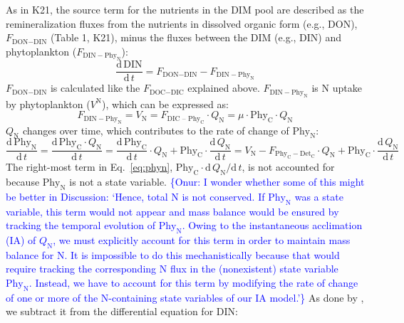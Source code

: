 \documentclass[gmd, manuscript]{copernicus}
\newcommand{\onur}[1]{\textcolor{blue}{\{Onur: #1\}}}
\begin{document}
As in K21, the source term for the nutrients in the DIM pool are described as the remineralization fluxes from the nutrients in dissolved organic form (e.g., DON), $F_{\text{DON}-\text{DIN}}$ (Table 1, K21), minus the fluxes between the DIM (e.g., DIN) and phytoplankton ($F_{\text{DIN}-\text{Phy}_{\text{N}}}$):
\begin{equation} \label{eq:sdin}
  \frac{\text{d}\,\text{DIN}}{\text{d}\,t} = F_{\text{DON}-\text{DIN}} - F_{\text{DIN}-\text{Phy}_{\text{N}}}
\end{equation}
$F_{\text{DON}-\text{DIN}}$ is calculated like the $F_{\text{DOC}-\text{DIC}}$ explained above. $F_{\text{DIN}-\text{Phy}_{\text{N}}}$ is N uptake by phytoplankton ($V^{\text{N}}$), which can be expressed as:
\begin{equation} \label{eq:dphyNdt}
  F_{\text{DIN}-\text{Phy}_{\text{N}}} = V_{\text{N}} = F_{\text{DIC -- Phy}_{\text{C}}} \cdot Q_{\text{N}} = \mu \cdot \text{Phy}_{\text{C}} \cdot Q_{\text{N}}
\end{equation}
$Q_{\text{N}}$ changes over time, which contributes to the rate of change of $\text{Phy}_{\text{N}}$:
\begin{equation}
  \label{eq:phyn}
  \frac{\mathrm{d}\,\text{Phy}_{\text{N}}}{\mathrm{d}\,t} = \frac{\mathrm{d}\,\text{Phy}_{\text{C}}\cdot Q_{\text{N}}}{\mathrm{d}\,t}
  = \frac{\mathrm{d}\,\text{Phy}_{\text{C}}}{\mathrm{d}\,t} \cdot Q_{\text{N}} + \text{Phy}_{\text{C}} \cdot \frac{\mathrm{d}\,Q_{\text{N}}}{\mathrm{d}\,t}
  = V_{\text{N}} - F_{\text{Phy}_{\text{C}}-\text{Det}_{\text{C}}}\cdot Q_{\text{N}} + \text{Phy}_{\text{C}} \cdot \frac{\mathrm{d}\,Q_{\text{N}}}{\mathrm{d}\,t}
\end{equation}
The right-most term in Eq.~\eqref{eq:phyn}, $\text{Phy}_{\text{C}}\cdot \mathrm{d}\,Q_{\text{N}} / \mathrm{d}\, t$, is not accounted for because $\text{Phy}_{\text{N}}$ is not a state variable.  \onur{I wonder whether some of this might be better in Discussion: `Hence, total N is not conserved.  If $\text{Phy}_{\text{N}}$ was a state variable, this term would not appear and mass balance would be ensured by tracking the temporal evolution of $\text{Phy}_{\text{N}}$.  Owing to the instantaneous acclimation (IA) of $Q_{\text{N}}$, we must explicitly account for this term in order to maintain mass balance for N\@.  It is impossible to do this mechanistically because that would require tracking the corresponding N flux in the (nonexistent) state variable $\text{Phy}_{\text{N}}$.  Instead, we have to account for this term by modifying the rate of change of one or more of the N-containing state variables of our IA model.'}  As done by \citet{Smith2016}, we subtract it from the differential equation for DIN\@:
\end{document}
